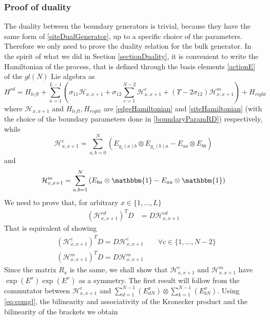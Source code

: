 \documentclass[10pt]{article}
\numberwithin{equation}{section}
\numberwithin{equation}{subsection}
\begin{document}
\subsubsection{Proof of duality}
The duality between the boundary generators is trivial, because they have the same form of \eqref{siteDualGenerator}, up to a specific choice of the parameters. Therefore we only need to prove the duality relation for the bulk generator. 
In the spirit of what we did in Section \ref{sectionDuality}, it is convenient to write the Hamiltonian of the process, that is defined through the basis elements \eqref{actionE} of the $gl(N)$ Lie algebra as 
\begin{equation}
	H^{rd}=H_{left}+\sum_{x=1}^{L-1}\left(\sigma_{11}\mathcal{H}_{x,x+1}+\sigma_{12}\sum_{c=1}^{N-2}\mathcal{H}_{x,x+1}^{c}+(\Upsilon-2\sigma_{12})\mathcal{H}_{x,x+1}^{m}\right)+H_{right}
\end{equation}
where $\mathcal{H}_{x,x+1}$ and $H_{left},H_{right}$ are \eqref{edgeHamiltonian}  and \eqref{siteHamiltonian} (with the choice of the boundary parameters done in \eqref{boundaryParamRD}) respectively, while
\begin{equation}
	\mathcal{H}_{x,x+1}^{c}=\sum_{a,b=0}^{N}\left(E_{g_{c}(a)b}\otimes E_{g_{c}(b)a}-E_{aa}\otimes E_{bb}\right)
\end{equation}
and 
\begin{equation}
	\mathcal{H}_{x,x+1}^{m}=\sum_{a,b=1}^{N}\left(E_{ba}\otimes \mathbbm{1}-E_{aa}\otimes \mathbbm{1}\right)
\end{equation}
We need to prove that, for arbitrary $x\in\{1,\ldots,L\}$
\begin{align}
	(\mathcal{H}_{x,x+1}^{rd})^{T}D&=D\mathcal{H}_{x,x+1}^{rd}\label{edgeDualityRelationRD}
\end{align}
That is equivalent of showing 
\begin{align}
	&(\mathcal{H}_{x,x+1}^{c})^{T}D=D\mathcal{H}_{x,x+1}^{c}\qquad \forall c\in \{1,\ldots,N-2\}\label{cDualityRelation}\\
	&(\mathcal{H}_{x,x+1}^{m})^{T}D=D\mathcal{H}_{x,x+1}^{m}\label{mDualityRelation}
\end{align}
Since the matrix $R_{x}$ is the same, we shall show that $\mathcal{H}_{x,x+1}^{c}$ and $\mathcal{H}_{x,x+1}^{m}$ have $\exp{(E^{x})}\exp{(E^{x})}$ as a symmetry. The first result will follow from the commutator between $\mathcal{H}_{x,x+1}^{c}$ and $\sum_{d=1}^{N-1}(E_{dN}^{x})\otimes \sum_{k=1}^{N-1}(E_{bN}^{x})$. Using \eqref{eq:comgl}, the bilinearity and associativity of the Kronecker product and the bilinearity of the brackets we obtain 
\end{document}
